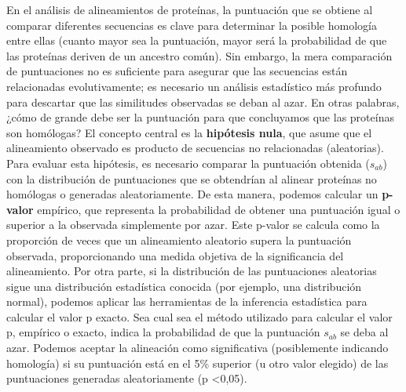 En el análisis de alineamientos de proteínas, la puntuación que se obtiene al comparar diferentes secuencias es clave para determinar la posible homología entre ellas (cuanto mayor sea la puntuación, mayor será la probabilidad de que las proteínas deriven de un ancestro común). Sin embargo, la mera comparación de puntuaciones no es suficiente para asegurar que las secuencias están relacionadas evolutivamente; es necesario un análisis estadístico más profundo para descartar que las similitudes observadas se deban al azar. En otras palabras, ¿cómo de grande debe ser la puntuación para que concluyamos que las proteínas son homólogas?
El concepto central es la \textbf{hipótesis nula}, que asume que el alineamiento observado es producto de secuencias no relacionadas (aleatorias). Para evaluar esta hipótesis, es necesario comparar la puntuación obtenida ($s_{ab}$) con la distribución de puntuaciones que se obtendrían al alinear proteínas no homólogas o generadas aleatoriamente. De esta manera, podemos calcular un \textbf{p-valor} empírico, que representa la probabilidad de obtener una puntuación igual o superior a la observada simplemente por azar. Este p-valor se calcula como la proporción de veces que un alineamiento aleatorio supera la puntuación observada, proporcionando una medida objetiva de la significancia del alineamiento.
Por otra parte, si la distribución de las puntuaciones aleatorias sigue una distribución estadística conocida (por ejemplo, una distribución normal), podemos aplicar las herramientas de la inferencia estadística para calcular el valor p exacto. Sea cual sea el método utilizado para calcular el valor p, empírico o exacto, indica la probabilidad de que la puntuación $s_{ab}$ se deba al azar. Podemos aceptar la alineación como significativa (posiblemente indicando homología) si su puntuación está en el 5\% superior (u otro valor elegido) de las puntuaciones generadas aleatoriamente (p <0,05).

